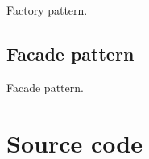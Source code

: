 \documentclass[letterpaper,10pt,english]{sphinxmanual}
\begin{document}
\begin{fulllineitems}
\label{index:spy.SiteFactory}
Factory pattern.

\end{fulllineitems}



\subsection{Facade pattern}
\label{index:facade-pattern}

\begin{fulllineitems}
\label{index:spy.SPy}
Facade pattern.

\end{fulllineitems}



\section{Source code}
\label{index:source-code}\label{index:module-spy}
\end{document}
